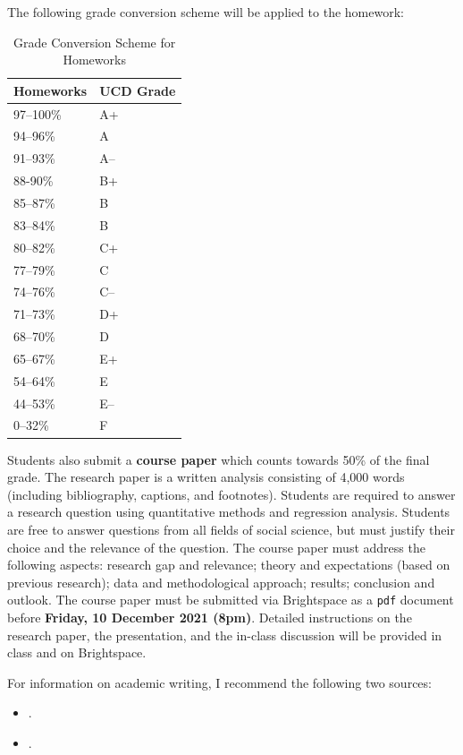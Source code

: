 \documentclass[abstract=on,parskip=full,headings=standardclasses,fontsize=11pt,paper=a4]{scrartcl}
\begin{document}
The following grade conversion scheme will be applied to the homework:


\begin{table}[h] \centering \singlespacing \footnotesize
\caption*{Grade Conversion Scheme for Homeworks}
\begin{tabular}{ l l} 
\toprule
Homeworks &  UCD Grade \\
\midrule
97--100\% & A+ \\
94--96\% & A \\
91--93\% & A-- \\
88-90\% & B+ \\
85--87\% & B \\
83--84\% & B \\
80--82\% & C+ \\
77--79\% & C \\
74--76\% & C-- \\
71--73\% & D+ \\
68--70\% & D \\
65--67\% & E+ \\
54--64\% & E \\
44--53\% & E--\\
0--32\% & F\\
\bottomrule
\end{tabular}
\end{table}



Students also submit a \textbf{course paper} which counts towards 50\% of the final grade. The research paper is a written analysis consisting of 4,000 words (including bibliography, captions, and footnotes). Students are required to  answer a research question using quantitative methods and regression analysis. Students are free to answer questions from all fields of social science, but must justify their choice and the relevance of the question. The course paper must address the following aspects: research gap and relevance; theory and expectations (based on previous research); data and methodological approach; results; conclusion and outlook. The course paper must be submitted via Brightspace as a \texttt{pdf} document before \textbf{Friday, 10 December 2021 (8pm)}.  Detailed instructions on the research paper, the presentation, and the in-class discussion will be provided in class and on Brightspace.

For information on academic writing, I recommend the following two sources:
\begin{itemize}
\item {}.
\item {}.
\end{itemize}
\end{document}
